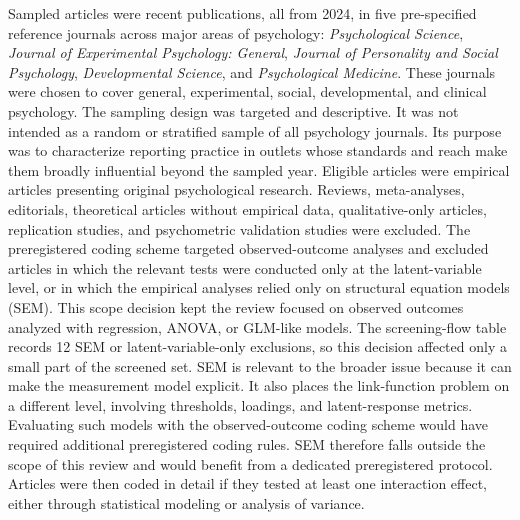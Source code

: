\documentclass[
  man,
  longtable,
  nolmodern,
  notxfonts,
  notimes,
  colorlinks=true,linkcolor=blue,citecolor=blue,urlcolor=blue]{apa7}
\begin{document}
Sampled articles were recent publications, all from 2024, in five
pre-specified reference journals across major areas of psychology:
\emph{Psychological Science}, \emph{Journal of Experimental Psychology:
General}, \emph{Journal of Personality and Social Psychology},
\emph{Developmental Science}, and \emph{Psychological Medicine}. These
journals were chosen to cover general, experimental, social,
developmental, and clinical psychology. The sampling design was targeted
and descriptive. It was not intended as a random or stratified sample of
all psychology journals. Its purpose was to characterize reporting
practice in outlets whose standards and reach make them broadly
influential beyond the sampled year. Eligible articles were empirical
articles presenting original psychological research. Reviews,
meta-analyses, editorials, theoretical articles without empirical data,
qualitative-only articles, replication studies, and psychometric
validation studies were excluded. The preregistered coding scheme
targeted observed-outcome analyses and excluded articles in which the
relevant tests were conducted only at the latent-variable level, or in
which the empirical analyses relied only on structural equation models
(SEM). This scope decision kept the review focused on observed outcomes
analyzed with regression, ANOVA, or GLM-like models. The screening-flow
table records 12 SEM or latent-variable-only exclusions, so this
decision affected only a small part of the screened set. SEM is relevant
to the broader issue because it can make the measurement model explicit.
It also places the link-function problem on a different level, involving
thresholds, loadings, and latent-response metrics. Evaluating such
models with the observed-outcome coding scheme would have required
additional preregistered coding rules. SEM therefore falls outside the
scope of this review and would benefit from a dedicated preregistered
protocol. Articles were then coded in detail if they tested at least one
interaction effect, either through statistical modeling or analysis of
variance.
\end{document}
